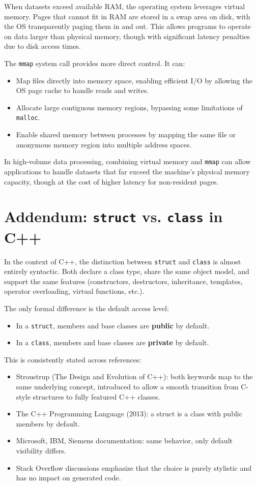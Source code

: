 \documentclass[11pt,letterpaper,oneside]{article}
\begin{document}
When datasets exceed available RAM, the operating system leverages virtual
memory. Pages that cannot fit in RAM are stored in a swap area on disk, with the
OS transparently paging them in and out. This allows programs to operate on data
larger than physical memory, though with significant latency penalties due to
disk access times.

The \texttt{mmap} system call provides more direct control. It can:

\begin{itemize}
    \item Map files directly into memory space, enabling efficient I/O by
    allowing the OS page cache to handle reads and writes.
    \item Allocate large contiguous memory regions, bypassing some limitations
    of \texttt{malloc}.
    \item Enable shared memory between processes by mapping the same file or
    anonymous memory region into multiple address spaces.
\end{itemize}

In high-volume data processing, combining virtual memory and \texttt{mmap} can
allow applications to handle datasets that far exceed the machine’s physical
memory capacity, though at the cost of higher latency for non-resident pages.

\section*{Addendum: \texttt{struct} vs. \texttt{class} in C++}

In the context of C++, the distinction between \texttt{struct} and
\texttt{class} is almost entirely syntactic. Both declare a class type, share
the same object model, and support the same features (constructors, destructors,
inheritance, templates, operator overloading, virtual functions, etc.).

The only formal difference is the default access level:
\begin{itemize}
    \item In a \texttt{struct}, members and base classes are \textbf{public} by
    default.
    \item In a \texttt{class}, members and base classes are \textbf{private} by
    default.
\end{itemize}

This is consistently stated across references:
\begin{itemize}
    \item Stroustrup (The Design and Evolution of C++): both keywords map to the
    same underlying concept, introduced to allow a smooth transition from
    C-style structures to fully featured C++ classes.
    \item The C++ Programming Language (2013): a struct is a class with public
    members by default.
    \item Microsoft, IBM, Siemens documentation: same behavior, only default
    visibility differs.
    \item Stack Overflow discussions emphasize that the choice is purely
    stylistic and has no impact on generated code.
\end{itemize}
\end{document}
